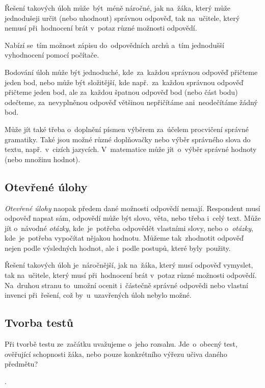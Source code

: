 \documentclass[10pt,a4paper]{article}
\begin{document}
            Řešení takových úloh může~být~méně náročné, jak na~žáka, který může jednodušeji určit (nebo uhodnout) správnou odpověď, tak na~učitele, který nemusí při~hodnocení brát v~potaz různé možnosti odpovědí.

            Nabízí se~tím možnost zápisu do~odpovědních archů a~tím jednodušší vyhodnocení pomocí počítače.

            Bodování úloh může být jednoduché, kde~za~každou správnou odpověď přičteme jeden bod, nebo může být složitější, kde např.~za~každou správnou odpověď přičteme jeden bod, ale za~každou špatnou odpověď bod (nebo část bodu) odečteme, za~nevyplněnou odpověď většinou nepřičítáme ani~neodečítáme žádný bod.

            Může jít také třeba o~doplnění písmen výběrem za~účelem procvičení správné gramatiky. Také jsou možné různé doplňovačky nebo výběr správného slova do textu, např.~v~cizích jazycích. V~matematice může jít~o~výběr správné hodnoty (nebo množinu hodnot).

        \subsection{Otevřené úlohy}
            \emph{Otevřené úlohy} naopak předem dané možnosti odpovědí nemají. Respondent musí odpověď napsat sám, odpovědí může být slovo, věta, nebo třeba i~celý text. Může jít o~návodné \emph{otázky}, kde~je~potřeba odpovědět vlastními slovy, nebo o~\emph{otázky}, kde~je~potřeba vypočítat nějakou hodnotu. Můžeme tak~zhodnotit odpověď nejen podle výsledných hodnot, ale i~podle postupů, které byly~použity.

            Řešení takových úloh je~náročnější, jak na~žáka, který musí odpověď vymyslet, tak na~učitele, který musí při~hodnocení brát v~potaz různé možnosti odpovědí. Na~druhou stranu to~umožní ocenit i~částečně správné odpovědi nebo vlastní invenci při~řešení, což by~u~uzavřených úloh nebylo možné. \cite{rozhlasOUtazky}

        \subsection{Tvorba testů}
            Při tvorbě testu ze~začátku uvažujeme o~jeho rozsahu. Jde~o~obecný test, ověřující schopnosti žáka, nebo pouze konkrétního výřezu učiva daného předmětu?

            . \cite{Suchoradsky:testy}
            
\end{document}
